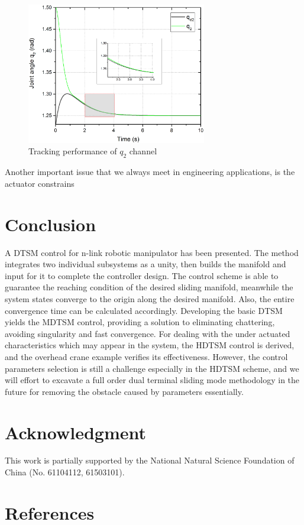 \documentclass[3p]{elsarticle}
\theoremstyle{plain}
\theoremstyle{remark}
\begin{document}
\begin{figure}
\centering
\includegraphics[width=0.7\textwidth]{paper3_fig7.eps}
\caption{Tracking performance of $q_2$ channel}
\label{Figure:7}
\end{figure}
Another important issue that we always meet in engineering applications, is the actuator constrains 
\section{Conclusion}\label{sec:5}
A DTSM control for n-link robotic manipulator has been presented. The method integrates two individual subsystems as a unity, then builds the manifold and input for it to complete the controller design. The control scheme is able to guarantee the reaching condition of the desired sliding manifold, meanwhile the system states converge to the origin along the desired manifold. Also, the entire convergence time can be calculated accordingly. Developing the basic DTSM yields the MDTSM control, providing a solution to eliminating chattering, avoiding singularity and fast convergence. For dealing with the under actuated characteristics which may appear in the system, the HDTSM control is derived, and the overhead crane example verifies its effectiveness. However, the control parameters selection is still a challenge especially in the HDTSM scheme, and we will effort to excavate a full order dual terminal sliding mode methodology in the future for removing the obstacle caused by parameters essentially.
\section{Acknowledgment}
This work is partially supported by the National Natural Science Foundation of China (No. 61104112, 61503101).
\section{References}


\end{document}
